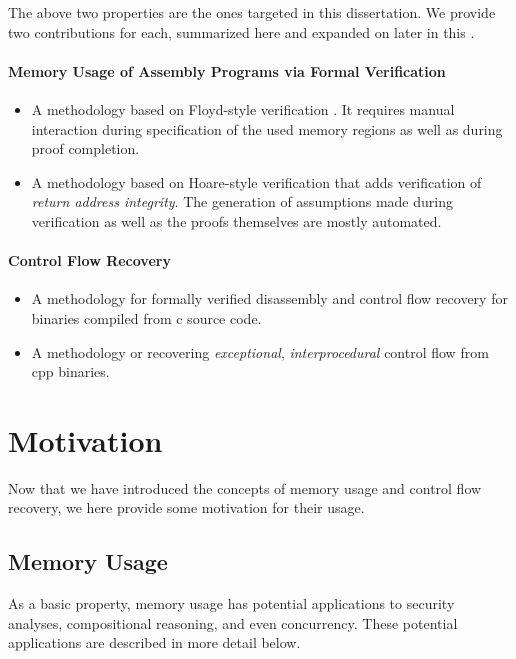 The above two properties are the ones targeted in this dissertation.
We provide two contributions for each, summarized here and expanded on later in this .
\paragraph{Memory Usage of Assembly Programs via Formal Verification}
\begin{itemize}
  \item A methodology based on Floyd-style verification \autocite{floyd1967assigning}.
  It requires manual interaction during specification of the used memory regions as well as during proof completion.
  \item A methodology based on Hoare-style verification \autocite{hoare1969axiomatic} that adds verification of \emph{return address integrity}.
  The generation of assumptions made during verification as well as the proofs themselves are mostly automated.
\end{itemize}

\paragraph{Control Flow Recovery}
\begin{itemize}
  \item A methodology for formally verified disassembly and control flow recovery for binaries compiled from \gls{c} source code.
  \item A methodology or recovering \emph{exceptional}, \emph{interprocedural} control flow from \gls{cpp} binaries.
\end{itemize}

\section{Motivation}
Now that we have introduced the concepts of memory usage and control flow recovery, we here provide some motivation for their usage.

\subsection{Memory Usage}
As a basic property, memory usage has potential applications to security analyses, compositional reasoning, and even concurrency.
These potential applications are described in more detail below.

